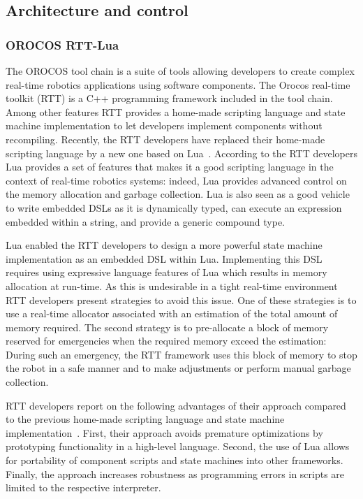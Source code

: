 \subsection{Architecture and control}

\newcommand{\ct}[1]{\texttt{#1}}

\subsubsection{OROCOS RTT-Lua}

The OROCOS tool chain is a suite of tools allowing developers to
create complex real-time robotics applications using software
components. The Orocos real-time toolkit (RTT) is a C++ programming
framework included in the tool chain. Among other features RTT
provides a home-made scripting language and state machine
implementation to let developers implement components without
recompiling. Recently, the RTT developers have replaced their
home-made scripting language by a new one based on
Lua~\cite{Klotzbucher:2010fk}. According to the RTT developers Lua
provides a set of features that makes it a good scripting language in
the context of real-time robotics systems: indeed, Lua provides
advanced control on the memory allocation and garbage collection. Lua
is also seen as a good vehicle to write embedded DSLs as it is
dynamically typed, can execute an expression embedded within a string,
and provide a generic compound type.

Lua enabled the RTT developers to design a more powerful state machine
implementation as an embedded DSL within Lua. Implementing this DSL
requires using expressive language features of Lua which results in
memory allocation at run-time. As this is undesirable in a tight
real-time environment RTT developers present strategies to avoid this
issue. One of these strategies is to use a real-time allocator
associated with an estimation of the total amount of memory required.
The second strategy is to pre-allocate a block of memory reserved for
emergencies when the required memory exceed the estimation: During
such an emergency, the RTT framework uses this block of memory to stop
the robot in a safe manner and to make adjustments or perform manual
garbage collection.

RTT developers report on the following advantages of their approach
compared to the previous home-made scripting language and state
machine implementation~\cite{Klotzbucher:2010fk}. First, their
approach avoids premature optimizations by prototyping functionality
in a high-level language. Second, the use of Lua allows for
portability of component scripts and state machines into other
frameworks. Finally, the approach increases robustness as programming
errors in scripts are limited to the respective interpreter.


